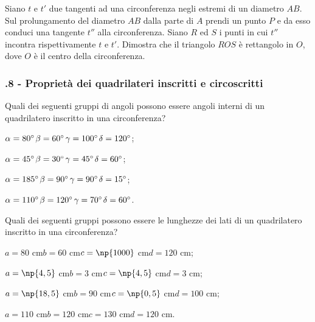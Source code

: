 \begin{multicols}{2}
\begin{esercizio}
\label{ese:5.40}
Siano $t$ e $t'$ due tangenti ad una circonferenza negli estremi di un diametro $AB$. Sul prolungamento del diametro $AB$ dalla parte di $A$ prendi un punto $P$ e da esso conduci una tangente $t''$ alla circonferenza. Siano $R$ ed $S$ i punti in cui $t''$ incontra rispettivamente $t$ e $t'$.  Dimostra che il triangolo $ROS$ è rettangolo in $O$, dove $O$ è il centro della circonferenza.
\end{esercizio}

\end{multicols}

 
\subsubsection*{\thechapter.8 - Proprietà dei quadrilateri inscritti e circoscritti}

\begin{esercizio}
\label{ese:5.41}
Quali dei seguenti gruppi di angoli possono essere angoli interni di un quadrilatero inscritto in una circonferenza?
\begin{enumeratea}
\item $\alpha=80{}^{\circ}$\tab	$\beta=60{}^{\circ}$\tab $\gamma=100{}^{\circ}$\tab $\delta=120{}^{\circ}$;
\item $\alpha=45{}^{\circ}$\tab	$\beta=30{}^{\circ}$\tab $\gamma=45{}^{\circ}$\tab $\delta=60{}^{\circ}$;
\item $\alpha=185{}^{\circ}$\tab $\beta=90{}^{\circ}$\tab $\gamma=90{}^{\circ}$\tab $\delta=15{}^{\circ}$;
\item $\alpha=110{}^{\circ}$\tab $\beta=120{}^{\circ}$\tab $\gamma=70{}^{\circ}$\tab $\delta=60{}^{\circ}$.
\end{enumeratea}
\end{esercizio}

\begin{esercizio}
\label{ese:5.42}
Quali dei seguenti gruppi possono essere le lunghezze dei lati di un quadrilatero inscritto in una circonferenza?
\begin{enumeratea}
\item $a=80$ cm\tab	$b=60$ cm\tab $c=\np{1000}$ cm\tab $d=120$ cm;
\item $a=\np{4,5}$ cm\tab $b=3$ cm\tab $c=\np{4,5}$ cm\tab $d=3$ cm;
\item $a=\np{18,5}$ cm\tab $b=90$ cm\tab $c=\np{0,5}$ cm\tab $d=100$ cm;
\item $a=110$ cm\tab $b=120$ cm\tab $c=130$ cm\tab $d=120$ cm.
\end{enumeratea}
\end{esercizio}

